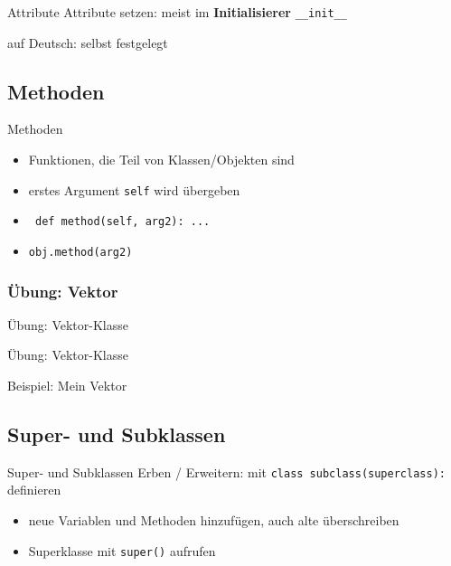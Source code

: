 \begin{frame}{Attribute}
	Attribute setzen: meist im \textbf{Initialisierer} \alert{\tt \_\_init\_\_}
	
    auf Deutsch: selbst festgelegt
\end{frame}

\subsection{Methoden}
\begin{frame}{Methoden}
	\begin{itemize}
		\item Funktionen, die Teil von Klassen/Objekten sind
		\item<2-> erstes Argument \texttt{self} wird übergeben
        \item<3-> \texttt{    def method(self, arg2): ...}
        \item<3-> \texttt{obj.method(arg2)}
	\end{itemize}
\end{frame}

\subsubsection{Übung: Vektor}
\begin{frame}{Übung: Vektor-Klasse}
    
\end{frame}
\begin{frame}{Übung: Vektor-Klasse}
    
\end{frame}
\begin{frame}{Beispiel: Mein Vektor}
    
\end{frame}

\subsection{Super- und Subklassen}
\begin{frame}{Super- und Subklassen}
	Erben / Erweitern: mit \alert{\tt class subclass(superclass):} definieren
	\begin{itemize}
		\item neue Variablen und Methoden hinzufügen, auch alte überschreiben
		\item Superklasse mit \alert{\tt super()} aufrufen
    \end{itemize}
	
\end{frame}

